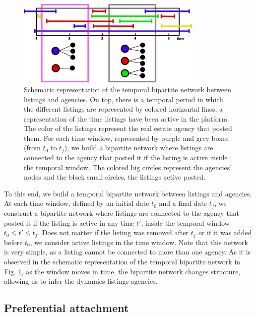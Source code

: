 \begin{figure}
    \vspace{0.2 cm}
    \centering
    \includegraphics[width = 0.8\textwidth]{Figs/Idealista_dynamics/temporal_bipartite.pdf}
	\caption[Housing market as a temporal bipartite network.]{Schematic representation of the temporal bipartite network between listings and agencies. On top, there is a temporal period in which the different listings are represented by colored horizontal lines, a representation of the time listings have been active in the platform. The color of the listings represent the real estate agency that posted them. For each time window, represented by purple and grey boxes (from $t_0$ to $t_f$), we build a bipartite network where listings are connected to the agency that posted it if the listing is active inside the temporal window. The colored big circles represent the agencies' nodes and the black small circles, the listings active posted. \label{fig:temporal_bipartite}}
\end{figure}

To this end, we build a temporal bipartite network between listings and agencies. At each time window, defined by an initial date $t_0$ and a final date $t_f$, we construct a bipartite network where listings are connected to the agency that posted it if the listing is active in any time $t'$, inside the temporal window $t_0 \leq t' \leq t_f$. Does not matter if the listing was removed after $t_f$ or if it was added before $t_0$, we consider active listings in the time window. Note that this network is very simple, as a listing cannot be connected to more than one agency. As it is observed in the schematic representation of the temporal bipartite network in Fig. \ref{fig:temporal_bipartite}, as the window moves in time, the bipartite network changes structure, allowing us to infer the dynamics listings-agencies.

\subsection{Preferential attachment}

